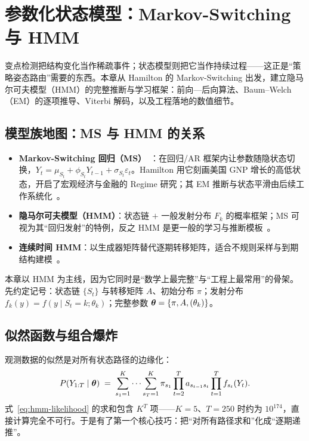 
\section{参数化状态模型：Markov-Switching 与 HMM}
\label{sec:statespace}

变点检测把结构变化当作稀疏事件；状态模型则把它当作持续过程——这正是“策略姿态路由”需要的东西。本章从 Hamilton 的 Markov-Switching 出发，建立隐马尔可夫模型（HMM）的完整推断与学习框架：前向—后向算法、Baum--Welch（EM）的逐项推导、Viterbi 解码，以及工程落地的数值细节。

\subsection{模型族地图：MS 与 HMM 的关系}

\begin{itemize}[itemsep=2pt]
\item \textbf{Markov-Switching 回归（MS）}~\cite{hamilton1989}：在回归/AR 框架内让参数随隐状态切换，$Y_t = \mu_{S_t} + \phi_{S_t} Y_{t-1} + \sigma_{S_t}\varepsilon_t$。Hamilton 用它刻画美国 GNP 增长的高低状态，开启了宏观经济与金融的 Regime 研究；其 EM 推断与状态平滑由后续工作系统化~\cite{hamilton1990,kim1994}。
\item \textbf{隐马尔可夫模型（HMM）}：状态链 $+$ 一般发射分布 $F_k$ 的概率框架；MS 可视为其“回归发射”的特例，反之 HMM 是更一般的学习与推断模板~\cite{rabiner1989}。
\item \textbf{连续时间 HMM}：以生成器矩阵替代逐期转移矩阵，适合不规则采样与到期结构建模~\cite{nystrup2015}。
\end{itemize}

本章以 HMM 为主线，因为它同时是“数学上最完整”与“工程上最常用”的骨架。先约定记号：状态链 $\{S_t\}$ 与转移矩阵 $A$、初始分布 $\pi$；发射分布 $f_k(y) = f(y \mid S_t = k; \theta_k)$；完整参数 $\bm{\theta} = \{\pi, A, (\theta_k)\}$。

\subsection{似然函数与组合爆炸}

观测数据的似然是对所有状态路径的边缘化：
\begin{equation}
P(Y_{1:T} \mid \bm{\theta}) \;=\; \sum_{s_1=1}^{K} \cdots \sum_{s_T=1}^{K}
\pi_{s_1} \prod_{t=2}^{T} a_{s_{t-1} s_t} \prod_{t=1}^{T} f_{s_t}(Y_t).
\label{eq:hmm-likelihood}
\end{equation}
式~\eqref{eq:hmm-likelihood} 的求和包含 $K^T$ 项——$K=5$、$T=250$ 时约为 $10^{174}$，直接计算完全不可行。于是有了第一个核心技巧：把“对所有路径求和”化成“逐期递推”。

